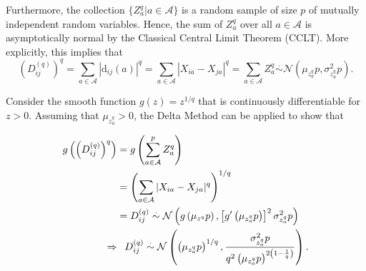 \documentclass[aos]{imsart}
\begin{document}
Furthermore, the collection $\{Z^q_a | a \in \mathcal{A}\}$ is a random sample of size $p$ of mutually independent random variables. Hence, the sum of $Z^q_a$ over all $a \in \mathcal{A}$ is asymptotically normal by the Classical Central Limit Theorem (CCLT). More explicitly, this implies that
%
\begin{equation}\label{eq:DqAsympt}
\left(D^{(q)}_{ij}\right)^q = \sum_{a \in \mathcal{A}} |\text{d}_{ij}(a)|^q = \sum_{a \in \mathcal{A}} |X_{ia} - X_{ja}|^q = \sum_{a \in \mathcal{A}} Z^q_a \overset{.}{\sim} \mathcal{N}\left(\mu_{z^q_a}p,\sigma^2_{z^q_a}p\right).
\end{equation}

Consider the smooth function $g(z) = z^{1/q}$ that is continuously differentiable for $z>0$. Assuming that $\mu_{z^q_a}>0$, the Delta Method \cite{allStats} can be applied to show that 

\begin{equation}\label{eq:DqDeltaMethod}
\begin{aligned}
g\left(\left(D^{(q)}_{ij}\right)^q\right) &= g\left(\displaystyle \sum_{a \in \mathcal{A}}^{p}Z^q_a\right) \\
&= \left(\sum_{a \in \mathcal{A}} |X_{ia} - X_{ja}|^q\right)^{1/q} \\
&= D^{(q)}_{ij} \overset{.}{\sim} \mathcal{N}\left(g\left(\mu_{z^q}p\right),\left[g^\prime \left(\mu_{z^q_a}p\right)\right]^2\sigma^2_{z^q_a}p\right) \\
\Rightarrow &\hphantom{=} D^{(q)}_{ij} \overset{.}{\sim} \mathcal{N}\left(\left(\mu_{z^q_a}p\right)^{1/q},\frac{\sigma^2_{z^q_a}p}{q^2\left(\mu_{z^q_a}p\right)^{2\left(1 - \frac{1}{q}\right)}}\right).
\end{aligned}
\end{equation}
\end{document}
